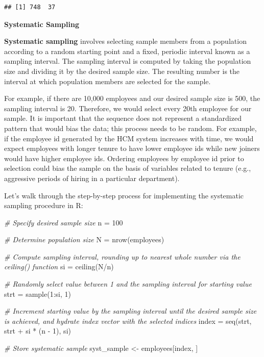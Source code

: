 \documentclass[
]{book}
\newenvironment{Shaded}{\begin{snugshade}}{\end{snugshade}}
\newcommand{\CommentTok}[1]{\textcolor[rgb]{0.56,0.35,0.01}{\textit{#1}}}
\newcommand{\DecValTok}[1]{\textcolor[rgb]{0.00,0.00,0.81}{#1}}
\newcommand{\FunctionTok}[1]{\textcolor[rgb]{0.00,0.00,0.00}{#1}}
\newcommand{\NormalTok}[1]{#1}
\newcommand{\OtherTok}[1]{\textcolor[rgb]{0.56,0.35,0.01}{#1}}
\newcommand{\SpecialCharTok}[1]{\textcolor[rgb]{0.00,0.00,0.00}{#1}}
\begin{document}
\begin{verbatim}
## [1] 748  37
\end{verbatim}

\textbf{Systematic Sampling}

\textbf{Systematic sampling} involves selecting sample members from a population according to a random starting point and a fixed, periodic interval known as a sampling interval. The sampling interval is computed by taking the population size and dividing it by the desired sample size. The resulting number is the interval at which population members are selected for the sample.

For example, if there are 10,000 employees and our desired sample size is 500, the sampling interval is 20. Therefore, we would select every 20th employee for our sample. It is important that the sequence does not represent a standardized pattern that would bias the data; this process needs to be random. For example, if the employee id generated by the HCM system increases with time, we would expect employees with longer tenure to have lower employee ids while new joiners would have higher employee ids. Ordering employees by employee id prior to selection could bias the sample on the basis of variables related to tenure (e.g., aggressive periods of hiring in a particular department).

Let's walk through the step-by-step process for implementing the systematic sampling procedure in R:

\begin{Shaded}
\begin{Highlighting}[]
\CommentTok{\# Specify desired sample size}
\NormalTok{n }\OtherTok{=} \DecValTok{100}

\CommentTok{\# Determine population size}
\NormalTok{N }\OtherTok{=} \FunctionTok{nrow}\NormalTok{(employees)}

\CommentTok{\# Compute sampling interval, rounding up to nearest whole number via the ceiling() function}
\NormalTok{si }\OtherTok{=} \FunctionTok{ceiling}\NormalTok{(N}\SpecialCharTok{/}\NormalTok{n)}

\CommentTok{\# Randomly select value between 1 and the sampling interval for starting value}
\NormalTok{strt }\OtherTok{=} \FunctionTok{sample}\NormalTok{(}\DecValTok{1}\SpecialCharTok{:}\NormalTok{si, }\DecValTok{1}\NormalTok{)}

\CommentTok{\# Increment starting value by the sampling interval until the desired sample size is achieved, and hydrate index vector with the selected indices}
\NormalTok{index }\OtherTok{=} \FunctionTok{seq}\NormalTok{(strt, strt }\SpecialCharTok{+}\NormalTok{ si }\SpecialCharTok{*}\NormalTok{ (n }\SpecialCharTok{{-}} \DecValTok{1}\NormalTok{), si)}

\CommentTok{\# Store systematic sample}
\NormalTok{syst\_sample }\OtherTok{\textless{}{-}}\NormalTok{ employees[index, ]}
\end{Highlighting}
\end{Shaded}
\end{document}
